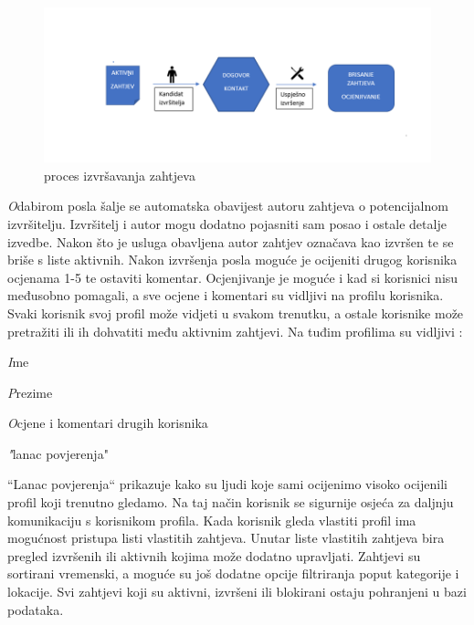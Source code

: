 		\begin{figure}[H]
			\includegraphics[scale=0.7]{slike/projekt2.png} %
			\centering
			\caption {proces izvršavanja zahtjeva}
			\label{fig:promjene}
		\end{figure}

        \textit Odabirom posla šalje se automatska obavijest autoru zahtjeva o potencijalnom izvršitelju. Izvršitelj i autor mogu dodatno pojasniti sam posao i ostale detalje izvedbe. Nakon što je usluga obavljena autor zahtjev označava kao izvršen te se briše s liste aktivnih.  
        \newline
Nakon izvršenja posla moguće je ocijeniti drugog korisnika ocjenama 1-5 te ostaviti komentar. Ocjenjivanje je moguće i kad si korisnici nisu međusobno pomagali, a sve ocjene i komentari su vidljivi na profilu korisnika.
        \newline
Svaki korisnik svoj profil može vidjeti u svakom trenutku, a ostale korisnike može pretražiti ili ih dohvatiti među aktivnim zahtjevi. Na tuđim profilima su vidljivi :
		
		\begin{packed_item}
			\item \textit Ime
			\item \textit Prezime
			\item \textit Ocjene i komentari drugih korisnika
			\item \textit "lanac povjerenja"

		\end{packed_item}
		
		
“Lanac povjerenja“ prikazuje kako su ljudi koje sami ocijenimo visoko ocijenili profil koji trenutno gledamo. Na taj način korisnik se sigurnije osjeća za daljnju komunikaciju s korisnikom profila.
\newline
Kada korisnik gleda vlastiti profil ima mogućnost pristupa listi vlastitih zahtjeva. Unutar liste vlastitih zahtjeva bira pregled izvršenih ili aktivnih kojima može dodatno upravljati. Zahtjevi su sortirani vremenski, a moguće su još dodatne opcije filtriranja poput kategorije i lokacije. Svi zahtjevi koji su aktivni, izvršeni ili blokirani ostaju pohranjeni u bazi podataka.
\newline

